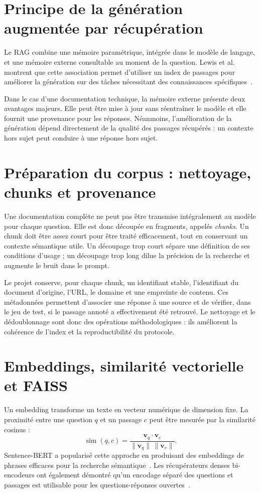 \documentclass[12pt,a4paper,oneside]{report}
\begin{document}
\section{Principe de la génération augmentée par récupération}

Le RAG combine une mémoire paramétrique, intégrée dans le modèle de langage, et
une mémoire externe consultable au moment de la question. Lewis et al.
montrent que cette association permet d'utiliser un index de passages pour
améliorer la génération sur des tâches nécessitant des connaissances
spécifiques~\cite{lewis2020rag}.

Dans le cas d'une documentation technique, la mémoire externe présente deux
avantages majeurs. Elle peut être mise à jour sans réentraîner le modèle et
elle fournit une provenance pour les réponses. Néanmoins, l'amélioration de la
génération dépend directement de la qualité des passages récupérés : un contexte
hors sujet peut conduire à une réponse hors sujet.

\section{Préparation du corpus : nettoyage, chunks et provenance}

Une documentation complète ne peut pas être transmise intégralement au modèle
pour chaque question. Elle est donc découpée en fragments, appelés \textit{chunks}.
Un chunk doit être assez court pour être traité efficacement, tout en conservant
un contexte sémantique utile. Un découpage trop court sépare une définition de
ses conditions d'usage ; un découpage trop long dilue la précision de la
recherche et augmente le bruit dans le prompt.

Le projet conserve, pour chaque chunk, un identifiant stable, l'identifiant du
document d'origine, l'URL, le domaine et une empreinte de contenu. Ces
métadonnées permettent d'associer une réponse à une source et de vérifier, dans
le jeu de test, si le passage annoté a effectivement été retrouvé. Le nettoyage
et le dédoublonnage sont donc des opérations méthodologiques : ils améliorent la
cohérence de l'index et la reproductibilité du protocole.

\section{Embeddings, similarité vectorielle et FAISS}

Un embedding transforme un texte en vecteur numérique de dimension fixe. La
proximité entre une question $q$ et un passage $c$ peut être mesurée par la
similarité cosinus :
\[
\operatorname{sim}(q,c)=\frac{\mathbf{v}_q\cdot\mathbf{v}_c}
{\lVert\mathbf{v}_q\rVert\,\lVert\mathbf{v}_c\rVert}.
\]
Sentence-BERT a popularisé cette approche en produisant des embeddings de
phrases efficaces pour la recherche sémantique~\cite{reimers2019sbert}. Les
récupérateurs denses bi-encodeurs ont également démontré qu'un encodage séparé
des questions et passages est utilisable pour les questions-réponses ouvertes~\cite{karpukhin2020dpr}.
\end{document}
